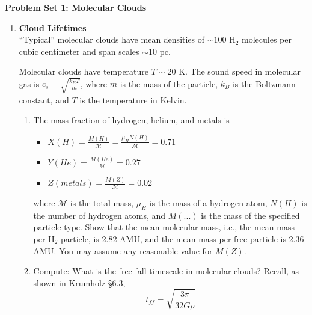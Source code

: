 \documentclass{article}
\begin{document}
\noindent\textbf{Problem Set 1: Molecular Clouds}

\begin{enumerate}
    \item \textbf{Cloud Lifetimes}\\
``Typical'' molecular clouds have mean densities of $\sim100$ H$_2$ molecules per
cubic centimeter and span scales $\sim10$ pc.


Molecular clouds have temperature $T\sim20$ K.
The sound speed in molecular gas is $c_s = \sqrt{\frac{k_B T}{m}}$, where $m$ is the
mass of the particle, $k_B$ is the Boltzmann constant, and $T$ is the
temperature in Kelvin.

\begin{enumerate}
    \item The mass fraction of hydrogen, helium, and metals is \citep{Kauffmann2008}
        \begin{itemize}
            \item $X(H)=\frac{M(H)}{\mathcal{M}}=\frac{\mu_H N(H)}{\mathcal{M}}=0.71$
            \item $Y(He)=\frac{M(He)}{\mathcal{M}}=0.27$
            \item $Z(metals)=\frac{M(Z)}{\mathcal{M}}=0.02$
        \end{itemize}
        where $\mathcal{M}$ is the total mass, $\mu_H$ is the mass of a
        hydrogen atom, $N(H)$ is the number of hydrogen atoms, and $M(...)$ is the mass of the specified particle type.
        Show that the mean molecular mass, i.e., the mean mass per H$_2$
        particle, is 2.82 AMU, and the mean mass per free particle is 2.36 AMU.
        You may assume any reasonable value for $M(Z)$. %


    \item Compute: What is the free-fall timescale in molecular clouds?  
        Recall, as shown in Krumholz \S6.3,
        $$t_{ff} = \sqrt{\frac{3 \pi}{32 G \rho}}$$


\end{enumerate}
\end{enumerate}
\end{document}
